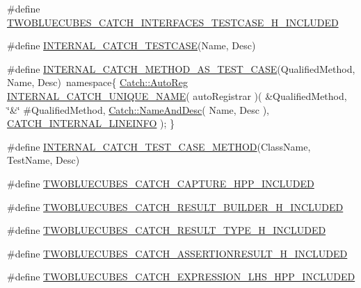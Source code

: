 \begin{DoxyCompactItemize}
\item 
\#define \hyperlink{a00094_a57d04225b51dece606932db63aebeb5f}{T\+W\+O\+B\+L\+U\+E\+C\+U\+B\+E\+S\+\_\+\+C\+A\+T\+C\+H\+\_\+\+I\+N\+T\+E\+R\+F\+A\+C\+E\+S\+\_\+\+T\+E\+S\+T\+C\+A\+S\+E\+\_\+\+H\+\_\+\+I\+N\+C\+L\+U\+D\+E\+D}
\item 
\#define \hyperlink{a00094_a1cb98d355207a372c71f19ea989eb0cc}{I\+N\+T\+E\+R\+N\+A\+L\+\_\+\+C\+A\+T\+C\+H\+\_\+\+T\+E\+S\+T\+C\+A\+S\+E}(Name,  Desc)
\item 
\#define \hyperlink{a00094_a668f4d27507d64accd74ca9fb5c66176}{I\+N\+T\+E\+R\+N\+A\+L\+\_\+\+C\+A\+T\+C\+H\+\_\+\+M\+E\+T\+H\+O\+D\+\_\+\+A\+S\+\_\+\+T\+E\+S\+T\+\_\+\+C\+A\+S\+E}(Qualified\+Method,  Name,  Desc)~namespace\{ \hyperlink{a00007}{Catch\+::\+Auto\+Reg} \hyperlink{a00094_afe320ceec108fc8c160f9ac3938f1bc8}{I\+N\+T\+E\+R\+N\+A\+L\+\_\+\+C\+A\+T\+C\+H\+\_\+\+U\+N\+I\+Q\+U\+E\+\_\+\+N\+A\+M\+E}( auto\+Registrar )( \&Qualified\+Method, \char`\"{}\&\char`\"{} \#Qualified\+Method, \hyperlink{a00053}{Catch\+::\+Name\+And\+Desc}( Name, Desc ), \hyperlink{a00094_abc0b2405454c51748a31e0393d9ad5d1}{C\+A\+T\+C\+H\+\_\+\+I\+N\+T\+E\+R\+N\+A\+L\+\_\+\+L\+I\+N\+E\+I\+N\+F\+O} ); \}
\item 
\#define \hyperlink{a00094_a46bb9f683226dfa2c857dd62af7aa106}{I\+N\+T\+E\+R\+N\+A\+L\+\_\+\+C\+A\+T\+C\+H\+\_\+\+T\+E\+S\+T\+\_\+\+C\+A\+S\+E\+\_\+\+M\+E\+T\+H\+O\+D}(Class\+Name,  Test\+Name,  Desc)
\item 
\#define \hyperlink{a00094_af06e9a04b0106596b7645d81e1aba5c0}{T\+W\+O\+B\+L\+U\+E\+C\+U\+B\+E\+S\+\_\+\+C\+A\+T\+C\+H\+\_\+\+C\+A\+P\+T\+U\+R\+E\+\_\+\+H\+P\+P\+\_\+\+I\+N\+C\+L\+U\+D\+E\+D}
\item 
\#define \hyperlink{a00094_a41060a914a029983a3a9db8d50724329}{T\+W\+O\+B\+L\+U\+E\+C\+U\+B\+E\+S\+\_\+\+C\+A\+T\+C\+H\+\_\+\+R\+E\+S\+U\+L\+T\+\_\+\+B\+U\+I\+L\+D\+E\+R\+\_\+\+H\+\_\+\+I\+N\+C\+L\+U\+D\+E\+D}
\item 
\#define \hyperlink{a00094_aac869d5d0c85bfa60806c9c82dde6288}{T\+W\+O\+B\+L\+U\+E\+C\+U\+B\+E\+S\+\_\+\+C\+A\+T\+C\+H\+\_\+\+R\+E\+S\+U\+L\+T\+\_\+\+T\+Y\+P\+E\+\_\+\+H\+\_\+\+I\+N\+C\+L\+U\+D\+E\+D}
\item 
\#define \hyperlink{a00094_aa5118eb771d1cdf1a14bce53296675dc}{T\+W\+O\+B\+L\+U\+E\+C\+U\+B\+E\+S\+\_\+\+C\+A\+T\+C\+H\+\_\+\+A\+S\+S\+E\+R\+T\+I\+O\+N\+R\+E\+S\+U\+L\+T\+\_\+\+H\+\_\+\+I\+N\+C\+L\+U\+D\+E\+D}
\item 
\#define \hyperlink{a00094_adadd64d692f8420a4e553145d3d401db}{T\+W\+O\+B\+L\+U\+E\+C\+U\+B\+E\+S\+\_\+\+C\+A\+T\+C\+H\+\_\+\+E\+X\+P\+R\+E\+S\+S\+I\+O\+N\+\_\+\+L\+H\+S\+\_\+\+H\+P\+P\+\_\+\+I\+N\+C\+L\+U\+D\+E\+D}

\end{DoxyCompactItemize}
